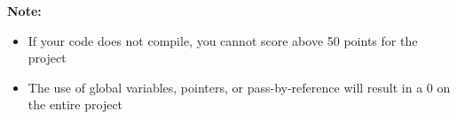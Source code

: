 \textbf{Note:}
\begin{itemize}
    \item If your code does not compile, you cannot score above 50 points for the project
    \item The use of global variables, pointers, or pass-by-reference will result in a 0 on the entire project
\end{itemize}
